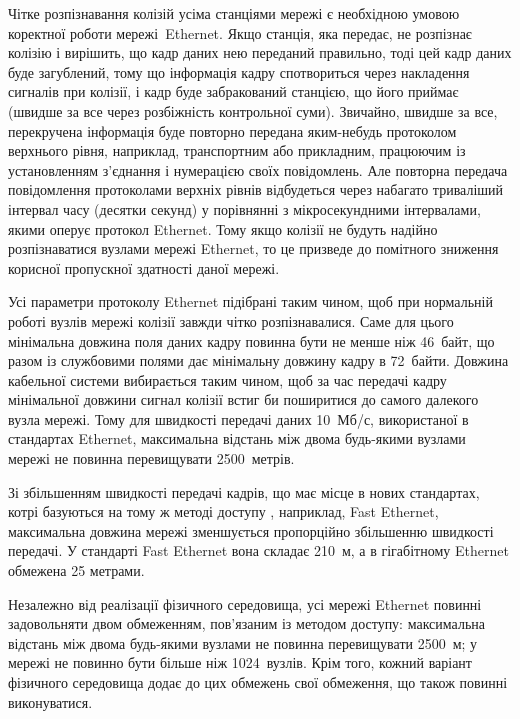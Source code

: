 \documentclass[
  ukrainian,
  simple,
  floatsection,
]{eskdnaukvd}
\begin{document}
      Чітке розпізнавання колізій усіма станціями мережі є необхідною умовою коректної роботи мережі~\textenglish{Ethernet}. Якщо станція, яка передає, не розпізнає колізію і вирішить, що кадр даних нею переданий правильно, тоді цей кадр даних буде загублений, тому що інформація кадру спотвориться через накладення сигналів при колізії, і кадр буде забракований станцією, що його приймає (швидше за все через розбіжність контрольної суми). Звичайно, швидше за все, перекручена інформація буде повторно передана яким-небудь протоколом верхнього рівня, наприклад, транспортним або прикладним, працюючим із установленням з'єднання і нумерацією своїх повідомлень. Але повторна передача повідомлення протоколами верхніх рівнів відбудеться через набагато триваліший інтервал часу (десятки секунд) у порівнянні з мікросекундними інтервалами, якими оперує протокол \textenglish{Ethernet}. Тому якщо колізії не будуть надійно розпізнаватися вузлами мережі \textenglish{Ethernet}, то це призведе до помітного зниження корисної пропускної здатності даної мережі.

      Усі параметри протоколу \textenglish{Ethernet} підібрані таким чином, щоб при нормальній роботі вузлів мережі колізії завжди чітко розпізнавалися. Саме для цього мінімальна довжина поля даних кадру повинна бути не менше ніж 46~байт, що разом із службовими полями дає мінімальну довжину кадру в 72~байти.  Довжина кабельної системи вибирається таким чином, щоб за час передачі кадру мінімальної довжини сигнал колізії встиг би поширитися до самого далекого вузла мережі. Тому для швидкості передачі даних 10~Мб/с, використаної в стандартах \textenglish{Ethernet}, максимальна відстань між двома будь-якими вузлами мережі не повинна перевищувати 2500~метрів.

      Зі збільшенням швидкості передачі кадрів, що має місце в нових стандартах, котрі базуються на тому ж методі доступу \textenglish{}, наприклад, \textenglish{Fast Ethernet}, максимальна довжина мережі зменшується пропорційно збільшенню швидкості передачі. У стандарті \textenglish{Fast Ethernet} вона складає 210~м, а в гігабітному \textenglish{Ethernet} обмежена 25 метрами.

      Незалежно від реалізації фізичного середовища, усі мережі \textenglish{Ethernet} повинні задовольняти двом обмеженням, пов'язаним із методом доступу: максимальна відстань між двома будь-якими вузлами не повинна перевищувати 2500~м; у мережі не повинно бути більше ніж 1024~вузлів. Крім того, кожний варіант фізичного середовища додає до цих обмежень свої обмеження, що також повинні виконуватися.
\end{document}
